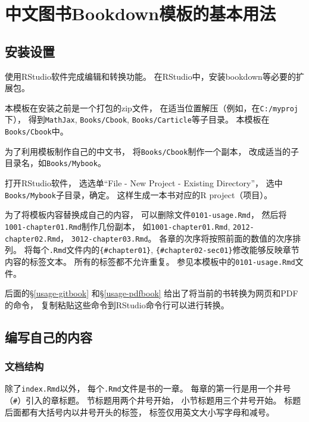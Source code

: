 \documentclass[
]{article}
\author{}
\date{\vspace{-2.5em}}
\begin{document}
{
\setcounter{tocdepth}{2}
\tableofcontents
}
\hypertarget{usage}{%
\section{中文图书Bookdown模板的基本用法}\label{usage}}

\hypertarget{usage-ins}{%
\subsection{安装设置}\label{usage-ins}}

使用RStudio软件完成编辑和转换功能。
在RStudio中，安装bookdown等必要的扩展包。

本模板在安装之前是一个打包的zip文件，
在适当位置解压（例如，在\texttt{C:/myproj}下），
得到\texttt{MathJax}, \texttt{Books/Cbook}, \texttt{Books/Carticle}等子目录。
本模板在\texttt{Books/Cbook}中。

为了利用模板制作自己的中文书，
将\texttt{Books/Cbook}制作一个副本，
改成适当的子目录名，如\texttt{Books/Mybook}。

打开RStudio软件，
选选单``File - New Project - Existing Directory''，
选中\texttt{Books/Mybook}子目录，确定。
这样生成一本书对应的R project（项目）。

为了将模板内容替换成自己的内容，
可以删除文件\texttt{0101-usage.Rmd}，
然后将\texttt{1001-chapter01.Rmd}制作几份副本，
如\texttt{1001-chapter01.Rmd}, \texttt{2012-chapter02.Rmd}，
\texttt{3012-chapter03.Rmd}。
各章的次序将按照前面的数值的次序排列。
将每个\texttt{.Rmd}文件内的\texttt{\{\#chapter01\}}, \texttt{\{\#chapter02-sec01\}}修改能够反映章节内容的标签文本。
所有的标签都不允许重复。
参见本模板中的\texttt{0101-usage.Rmd}文件。

后面的§\ref{usage-gitbook} 和§\ref{usage-pdfbook} 给出了将当前的书转换为网页和PDF的命令，
复制粘贴这些命令到RStudio命令行可以进行转换。

\hypertarget{usage-writing}{%
\subsection{编写自己的内容}\label{usage-writing}}

\hypertarget{usage-writing-struct}{%
\subsubsection{文档结构}\label{usage-writing-struct}}

除了\texttt{index.Rmd}以外，
每个\texttt{.Rmd}文件是书的一章。
每章的第一行是用一个井号（\texttt{\#}）引入的章标题。
节标题用两个井号开始，
小节标题用三个井号开始。
标题后面都有大括号内以井号开头的标签，
标签仅用英文大小写字母和减号。
\end{document}
